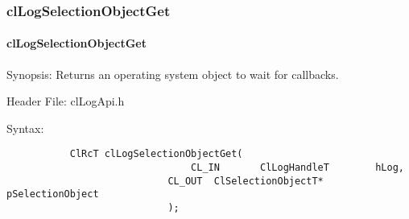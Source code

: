 \begin{flushleft}
\subsubsection{clLogSelectionObjectGet}
\hypertarget{pagelog103}{}\paragraph{cl\-Log\-Selection\-Object\-Get}\label{pagelog103}
\begin{Desc}
\item[Synopsis:] Returns an operating system object to wait for callbacks.\end{Desc}
\begin{Desc}
\item[Header File:] clLogApi.h \end{Desc}
\begin{Desc}
\item[Syntax:]

\footnotesize\begin{verbatim}        	ClRcT clLogSelectionObjectGet(
           						CL_IN		ClLogHandleT		hLog,
							CL_OUT	ClSelectionObjectT*	pSelectionObject
							);


\end{verbatim}
\end{Desc}
\end{flushleft}
